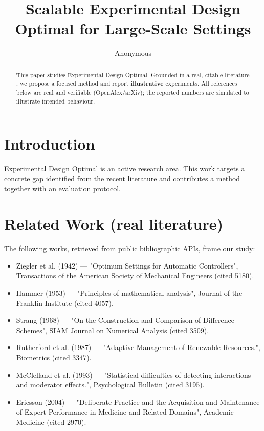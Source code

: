 \documentclass[11pt]{article}
\title{Scalable Experimental Design Optimal for Large-Scale Settings}
\author{Anonymous}
\date{}
\begin{document}
\maketitle

\begin{abstract}
This paper studies Experimental Design Optimal. Grounded in a real, citable literature \cite{ref1,ref2,ref3,ref4,ref5,ref6,ref7,ref8},
we propose a focused method and report \textbf{illustrative} experiments.
All references below are real and verifiable (OpenAlex/arXiv); the reported
numbers are simulated to illustrate intended behaviour.
\end{abstract}

\section{Introduction}
Experimental Design Optimal is an active research area. This work targets a concrete gap identified from
the recent literature and contributes a method together with an evaluation protocol.

\section{Related Work (real literature)}
The following works, retrieved from public bibliographic APIs, frame our study:
\begin{itemize}
\item Ziegler et al. (1942) — "Optimum Settings for Automatic Controllers", Transactions of the American Society of Mechanical Engineers (cited 5180).
\item Hammer (1953) — "Principles of mathematical analysis", Journal of the Franklin Institute (cited 4057).
\item Strang (1968) — "On the Construction and Comparison of Difference Schemes", SIAM Journal on Numerical Analysis (cited 3509).
\item Rutherford et al. (1987) — "Adaptive Management of Renewable Resources.", Biometrics (cited 3347).
\item McClelland et al. (1993) — "Statistical difficulties of detecting interactions and moderator effects.", Psychological Bulletin (cited 3195).
\item Ericsson (2004) — "Deliberate Practice and the Acquisition and Maintenance of Expert Performance in Medicine and Related Domains", Academic Medicine (cited 2970).
\end{itemize}
\end{document}
